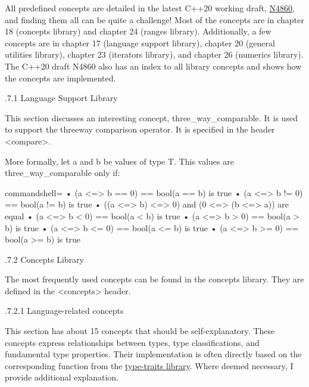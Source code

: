 All predefined concepts are detailed in the latest C++20 working draft, \href{https://isocpp.org/files/papers/N4860.pdf}{N4860}, and finding them all can be quite a challenge! Most of the concepts are in chapter 18 (concepts library) and chapter 24 (ranges library). Additionally, a few concepts are in chapter 17 (language support library), chapter 20 (general utilities library), chapter 23 (iterators library), and chapter 26 (numerics library). The C++20 draft N4860 also has an index to all library concepts and shows how the concepts are implemented.

.7.1\hspace{0.2cm} Language Support Library

This section discusses an interesting concept, three\_way\_comparable. It is used to support the threeway comparison operator. It is specified in the header <compare>.

More formally, let a and b be values of type T. This values are three\_way\_comparable only if:

\begin{tcblisting}{commandshell={}}
• (a <=> b == 0) == bool(a == b) is true
• (a <=> b != 0) == bool(a != b) is true
• ((a <=> b) <=> 0) and (0 <=> (b <=> a)) are equal
• (a <=> b < 0) == bool(a < b) is true
• (a <=> b > 0) == bool(a > b) is true
• (a <=> b <= 0) == bool(a <= b) is true
• (a <=> b >= 0) == bool(a >= b) is true
\end{tcblisting}

.7.2\hspace{0.2cm} Concepts Library

The most frequently used concepts can be found in the concepts library. They are defined in the <concepts> header.

.7.2.1\hspace{0.2cm} Language-related concepts

This section has about 15 concepts that should be self-explanatory. These concepts express relationships between types, type classifications, and fundamental type properties. Their implementation is often directly based on the corresponding function from the \href{https://en.cppreference.com/w/cpp/header/type_traits}{type-traits library}. Where deemed necessary, I provide additional explanation.

